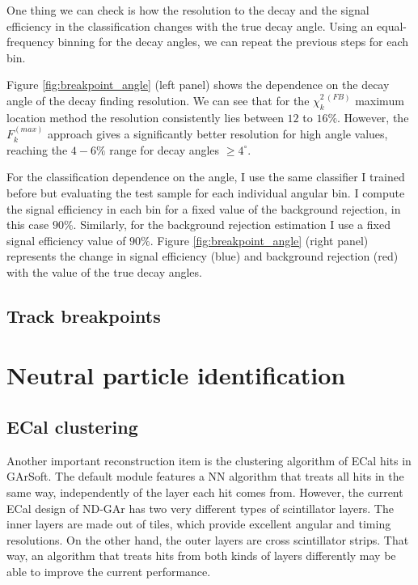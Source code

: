 One thing we can check is how the resolution to the decay and the signal efficiency in the classification changes with the true decay angle. Using an equal-frequency binning for the decay angles, we can repeat the previous steps for each bin.

Figure \ref{fig:breakpoint_angle} (left panel) shows the dependence on the decay angle of the decay finding resolution. We can see that for the $\chi_{k}^{2 \ (FB)}$ maximum location method the resolution consistently lies between $12$ to $16\%$. However, the $F^{(max)}_{k}$ approach gives a significantly better resolution for high angle values, reaching the $4-6\%$ range for decay angles $\geq 4^{\circ}$.

For the classification dependence on the angle, I use the same classifier I trained before but evaluating the test sample for each individual angular bin. I compute the signal efficiency in each bin for a fixed value of the background rejection, in this case $90\%$. Similarly, for the background rejection estimation I use a fixed signal efficiency value of $90\%$. Figure \ref{fig:breakpoint_angle} (right panel) represents the change in signal efficiency (blue) and background rejection (red) with the value of the true decay angles.

\subsection{Track breakpoints}

\section{Neutral particle identification}

\subsection{ECal clustering}

Another important reconstruction item is the clustering algorithm of ECal hits in GArSoft. The default module features a NN algorithm that treats all hits in the same way, independently of the layer each hit comes from. However, the current ECal design of ND-GAr has two very different types of scintillator layers. The inner layers are made out of tiles, which provide excellent angular and timing resolutions. On the other hand, the outer layers are cross scintillator strips. That way, an algorithm that treats hits from both kinds of layers differently may be able to improve the current performance.

